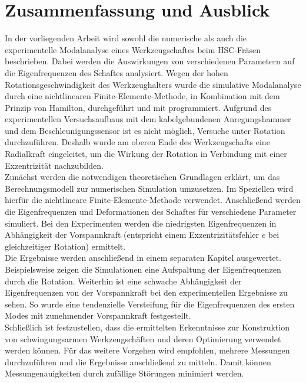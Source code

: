 	\pagestyle{fancy}
	\section{Zusammenfassung und Ausblick} \label{sec:Zusammenfassung}
	In der vorliegenden Arbeit wird sowohl die numerische als auch die experimentelle Modalanalyse eines Werkzeugschaftes beim HSC-Fräsen beschrieben. Dabei werden die Auswirkungen von verschiedenen Parametern auf die Eigenfrequenzen des Schaftes analysiert. Wegen der hohen Rotationsgeschwindigkeit des Werkzeughalters wurde die simulative Modalanalyse durch eine nichtlinearen Finite-Elemente-Methode, in Kombination mit dem Prinzip von Hamilton, durchgeführt und mit \Matlab programmiert. Aufgrund des experimentellen Versuchsaufbaus mit dem kabelgebundenen Anregungshammer und dem Beschleunigungssensor ist es nicht möglich, Versuche unter Rotation durchzuführen. Deshalb wurde am oberen Ende des Werkzeugschafts eine Radialkraft eingeleitet, um die Wirkung der Rotation in Verbindung mit einer Exzentrizität nachzubilden.\\
	
	Zunächst werden die notwendigen theoretischen Grundlagen erklärt, um das Berechnungsmodell zur numerischen Simulation umzusetzen. Im Speziellen wird hierfür die nichtlineare Finite-Elemente-Methode verwendet. Anschließend werden die Eigenfrequenzen und Deformationen des Schaftes für verschiedene Parameter simuliert. Bei den Experimenten werden die niedrigsten Eigenfrequenzen in Abhängigkeit der Vorspannkraft (entspricht einem Exzentrizitätsfehler $e$ bei gleichzeitiger Rotation) ermittelt.\\
	
	Die Ergebnisse werden anschließend in einem separaten Kapitel ausgewertet. Beispielsweise zeigen die Simulationen eine Aufspaltung der Eigenfrequenzen durch die Rotation. Weiterhin ist eine schwache Abhängigkeit der Eigenfrequenzen von der Vorspannkraft bei den experimentellen Ergebnisse zu sehen. So wurde eine tendenzielle Versteifung für die Eigenfrequenzen des ersten Modes mit zunehmender Vorspannkraft festgestellt.\\
	
	Schließlich ist festzustellen, dass die ermittelten Erkenntnisse zur Konstruktion von schwingungsarmen Werkzeugschäften und deren Optimierung verwendet werden können. Für das weitere Vorgehen wird empfohlen, mehrere Messungen durchzuführen und die Ergebnisse anschließend zu mitteln. Damit können Messungenauigkeiten durch zufällige Störungen minimiert werden.